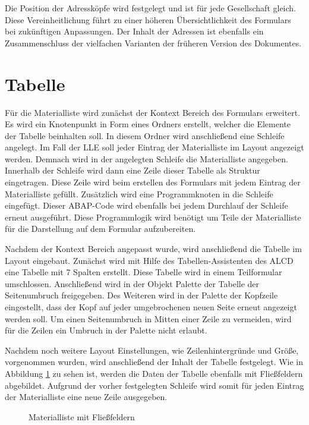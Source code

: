 Die Position der Adressköpfe wird festgelegt und ist für jede Gesellschaft gleich. Diese Vereinheitlichung führt zu einer höheren Übersichtlichkeit des Formulars bei zukünftigen Anpassungen. Der Inhalt der Adressen ist ebenfalls ein Zusammenschluss der vielfachen Varianten der früheren Version des Dokumentes.


\FloatBarrier

\section{Tabelle}

Für die Materialliste wird zunächst der Kontext Bereich des Formulars erweitert. Es wird ein Knotenpunkt in Form eines Ordners erstellt, welcher die Elemente der Tabelle beinhalten soll. In diesem Ordner wird anschließend eine Schleife angelegt. Im Fall der \ac{LLE} soll jeder Eintrag der Materialliste im Layout angezeigt werden. Demnach wird in der angelegten Schleife die Materialliste angegeben. Innerhalb der Schleife wird dann eine Zeile dieser Tabelle als Struktur eingetragen. Diese Zeile wird beim erstellen des Formulars mit jedem Eintrag der Materialliste gefüllt. Zusätzlich wird eine Programmknoten in die Schleife eingefügt. Dieser \ac{ABAP}-Code wird ebenfalls bei jedem Durchlauf der Schleife erneut ausgeführt. Diese Programmlogik wird benötigt um Teile der Materialliste für die Darstellung auf dem Formular aufzubereiten.

Nachdem der Kontext Bereich angepasst wurde, wird anschließend die Tabelle im Layout eingebaut. Zunächst wird mit Hilfe des Tabellen-Assistenten des \ac{ALCD} eine Tabelle mit 7 Spalten erstellt. Diese Tabelle wird in einem Teilformular umschlossen. Anschließend wird in der Objekt Palette der Tabelle der Seitenumbruch freigegeben. Des Weiteren wird in der Palette der Kopfzeile eingestellt, dass der Kopf auf jeder umgebrochenen neuen Seite erneut angezeigt werden soll. Um einen Seitenumbruch in Mitten einer Zeile zu vermeiden, wird für die Zeilen ein Umbruch in der Palette nicht erlaubt. 

Nachdem noch weitere Layout Einstellungen, wie Zeilenhintergründe und Größe, vorgenommen wurden, wird anschließend der Inhalt der Tabelle festgelegt. Wie in Abbildung \ref{figTab} zu sehen ist, werden die Daten der Tabelle ebenfalls mit Fließfeldern abgebildet. Aufgrund der vorher festgelegten Schleife wird somit für jeden Eintrag der Materialliste eine neue Zeile ausgegeben.

\begin{figure}[ht]
	\centering
	\caption{Materialliste mit Fließfeldern}
	\label{figTab}
	
\end{figure}

